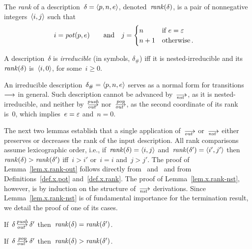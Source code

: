 \begin{definition}
  \label{def.x.rank}
  The \emph{rank} of a description~$\delta=\<p,n,e>$,
  denoted~$\operatorname{\mathit{rank}}(\delta)$, is a pair of nonnegative integers~$\<i,j>$ such
  that
  \begin{alignat*}{2}
    i&=\operatorname{\mathit{pot}}(p,e) &\quad\text{and}\quad
    j&=
       \begin{cases}
         n  &\text{if~$e=\varepsilon$}\\
         n+1&\text{otherwise\,.}
       \end{cases}
  \end{alignat*}
\end{definition}

\begin{definition}
  \label{def.x.H}
  A description~$\delta$ is \emph{irreducible} (in symbols, $\delta_\#$) iff
  it is nested-irreducible and its~$\operatorname{\mathit{rank}}(\delta)$ is~$\<i,0>$, for
  some~$i\ge0$.
\end{definition}

An irreducible description~$\delta_\#=\<p,n,e>$ serves as a normal form for
transitions~$\trans$ in general.  Such description cannot be advanced
by~$\nst$, as it is nested-irreducible, and neither by~$\outpush$
nor~$\outpop$, as the second coordinate of its rank is~0, which
implies~$e=\varepsilon$ and~$n=0$.

The next two lemmas establish that a single application of~$\out$ or~$\nst$
either preserves or decreases the rank of the input description.  All rank
comparisons assume lexicographic order, i.e., if~$\rank(\delta)=\<i,j>$
and~$\rank(\delta')=\<i',j'>$ then~$\operatorname{\mathit{rank}}(\delta)>\operatorname{\mathit{rank}}(\delta')$ iff~$i>i'$
or~$i=i$ and~$j>j'$.
The proof of Lemma~\ref{lem.x.rank-out} follows directly from~
and~ and from Definitions~\ref{def.x.pot} and~\ref{def.x.rank}.  The
proof of Lemma~\ref{lem.x.rank-nst}, however, is by induction on the
structure of~$\nst$ derivations.  Since Lemma~\ref{lem.x.rank-nst} is of
fundamental importance for the termination result, we detail the proof of
one of its cases.

\begin{lemma}\strut
  \label{lem.x.rank-out}
  \begin{enumerate:a}
  \item\label{lem.rank-out-push} If~$\delta\outpush\delta'$
    then~$\operatorname{\mathit{rank}}(\delta)=\operatorname{\mathit{rank}}(\delta')$.
  \item\label{lem.rank-out-pop} If~$\delta\outpop\delta'$
    then~$\operatorname{\mathit{rank}}(\delta)>\operatorname{\mathit{rank}}(\delta')$.
  \end{enumerate:a}
\end{lemma}

